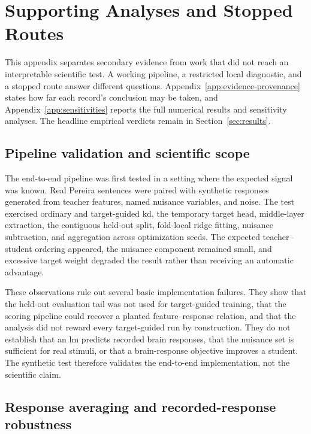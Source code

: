 \section{Supporting Analyses and Stopped Routes}
\label{app:secondary}

This appendix separates secondary evidence from work that did not reach an interpretable scientific test.
A working pipeline, a restricted local diagnostic, and a stopped route answer different questions.
Appendix~\ref{app:evidence-provenance} states how far each record's conclusion may be taken, and Appendix~\ref{app:sensitivities} reports the full numerical results and sensitivity analyses.
The headline empirical verdicts remain in Section~\ref{sec:results}.

\subsection{Pipeline validation and scientific scope}

The end-to-end pipeline was first tested in a setting where the expected signal was known.
Real Pereira sentences \autocite{pereira2018} were paired with synthetic responses generated from teacher features, named nuisance variables, and noise.
The test exercised ordinary and target-guided \ac{kd}, the temporary target head, middle-layer extraction, the contiguous held-out split, fold-local ridge fitting, nuisance subtraction, and aggregation across optimization seeds.
The expected teacher--student ordering appeared, the nuisance component remained small, and excessive target weight degraded the result rather than receiving an automatic advantage. 

These observations rule out several basic implementation failures.
They show that the held-out evaluation tail was not used for target-guided training, that the scoring pipeline could recover a planted feature--response relation, and that the analysis did not reward every target-guided run by construction.
They do not establish that an \ac{lm} predicts recorded brain responses, that the nuisance set is sufficient for real stimuli, or that a brain-response objective improves a student.
The synthetic test therefore validates the end-to-end implementation, not the scientific claim.

\subsection{Response averaging and recorded-response robustness}

